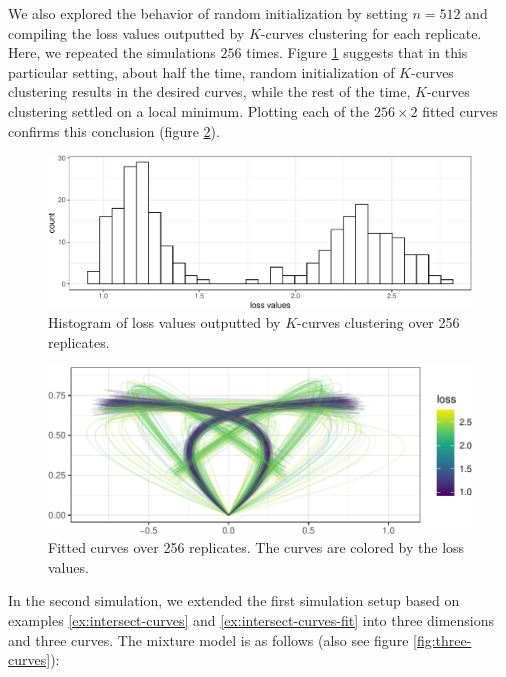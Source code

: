 \documentclass[
  12pt,
]{article}
\theoremstyle{definition}
\theoremstyle{definition}
\theoremstyle{definition}
\theoremstyle{definition}
\theoremstyle{remark}
\begin{document}
We also explored the behavior of random initialization by setting \(n = 512\) and compiling the loss values outputted by \(K\)-curves clustering for each replicate.
Here, we repeated the simulations \(256\) times.
Figure \ref{fig:repeat-losses} suggests that in this particular setting, about half the time, random initialization of \(K\)-curves clustering results in the desired curves, while the rest of the time, \(K\)-curves clustering settled on a local minimum.
Plotting each of the \(256 \times 2\) fitted curves confirms this conclusion (figure \ref{fig:repeat-curves}).

\begin{figure}[H]

{\centering \includegraphics{draft_files/figure-latex/repeat-losses-1} 

}

\caption{Histogram of loss values outputted by $K$-curves clustering over 256 replicates.}\label{fig:repeat-losses}
\end{figure}

\begin{figure}[H]

{\centering \includegraphics{draft_files/figure-latex/repeat-curves-1} 

}

\caption{Fitted curves over 256 replicates. The curves are colored by the loss values.}\label{fig:repeat-curves}
\end{figure}

In the second simulation, we extended the first simulation setup based on examples \ref{ex:intersect-curves} and \ref{ex:intersect-curves-fit} into three dimensions and three curves.
The mixture model is as follows (also see figure \ref{fig:three-curves}):
\end{document}
